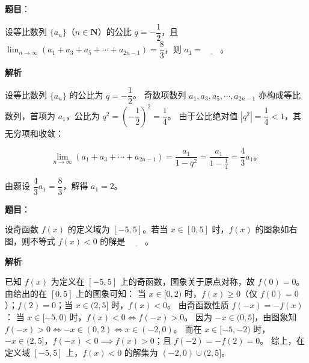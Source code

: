 \begin{answer}

\textbf{题目}：

设等比数列 $\{a_n\}$（$n \in \mathbf{N}$）的公比 $q = -\dfrac{1}{2}$，且 $\displaystyle\lim_{n\to\infty}(a_1 + a_3 + a_5 + \cdots + a_{2n-1}) = \dfrac{8}{3}$，则 $a_1 = \underline{\qquad}$。

\textbf{解析}

设等比数列 $\{a_n\}$ 的公比为 $q = -\dfrac{1}{2}$。
奇数项数列 $a_1, a_3, a_5, \cdots, a_{2n-1}$ 亦构成等比数列，首项为 $a_1$，公比为 $q^2 = \left(-\dfrac{1}{2}\right)^2 = \dfrac{1}{4}$。
由于公比绝对值 $|q^2| = \dfrac{1}{4} < 1$，其无穷项和收敛：

\nopagebreak[4]
\[
\lim_{n\to\infty}(a_1 + a_3 + \cdots + a_{2n-1}) = \dfrac{a_1}{1 - q^2} = \dfrac{a_1}{1 - \frac{1}{4}} = \dfrac{4}{3}a_1\mbox{。}
\]

由题设 $\dfrac{4}{3}a_1 = \dfrac{8}{3}$，解得 $a_1 = 2$。


\end{answer}
\begin{answer}

\textbf{题目}：

设奇函数 $f(x)$ 的定义域为 $[-5, 5]$。若当 $x \in [0, 5]$ 时，$f(x)$ 的图象如右图，则不等式 $f(x) < 0$ 的解是 $\underline{\qquad}$。
\nopagebreak[4]
\begin{center}\end{center}
\nopagebreak[4]
\textbf{解析}

已知 $f(x)$ 为定义在 $[-5, 5]$ 上的奇函数，图象关于原点对称，故 $f(0) = 0$。
由给出的在 $[0, 5]$ 上的图象可知：
当 $x \in [0, 2)$ 时，$f(x) \geqslant 0$（仅 $f(0)=0$）；$f(2) = 0$；当 $x \in (2, 5]$ 时，$f(x) < 0$。
由奇函数性质 $f(-x) = -f(x)$：
当 $x \in [-5, 0)$ 时，$f(x) < 0 \iff f(-x) > 0$。
因为 $-x \in (0, 5]$，由图象知 $f(-x) > 0 \iff -x \in (0, 2) \iff x \in (-2, 0)$。
而在 $x \in [-5, -2)$ 时，$-x \in (2, 5]$，$f(-x) < 0 \implies f(x) > 0$；且 $f(-2) = -f(2) = 0$。
综上，在定义域 $[-5, 5]$ 上，$f(x) < 0$ 的解集为 $(-2, 0) \cup (2, 5]$。

\gkanswer{答案：$(-2, 0) \cup (2, 5]$}

\end{answer}
